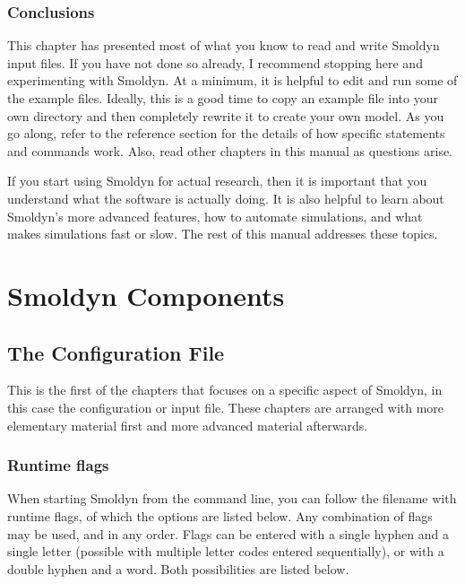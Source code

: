 \documentclass {scrbook}
\begin{document}
\section{Conclusions}

This chapter has presented most of what you know to read and write Smoldyn input files. If you have not done so already, I recommend stopping here and experimenting with Smoldyn. At a minimum, it is helpful to edit and run some of the example files. Ideally, this is a good time to copy an example file into your own directory and then completely rewrite it to create your own model. As you go along, refer to the reference section for the details of how specific statements and commands work. Also, read other chapters in this manual as questions arise.

If you start using Smoldyn for actual research, then it is important that you understand what the software is actually doing. It is also helpful to learn about Smoldyn's more advanced features, how to automate simulations, and what makes simulations fast or slow. The rest of this manual addresses these topics.

\part{Smoldyn Components}

\chapter{The Configuration File}

This is the first of the chapters that focuses on a specific aspect of Smoldyn, in this case the configuration or input file. These chapters are arranged with more elementary material first and more advanced material afterwards.

\section{Runtime flags}

When starting Smoldyn from the command line, you can follow the filename with runtime flags, of which the options are listed below. Any combination of flags may be used, and in any order. Flags can be entered with a single hyphen and a single letter (possible with multiple letter codes entered sequentially), or with a double hyphen and a word. Both possibilities are listed below.
\end{document}
